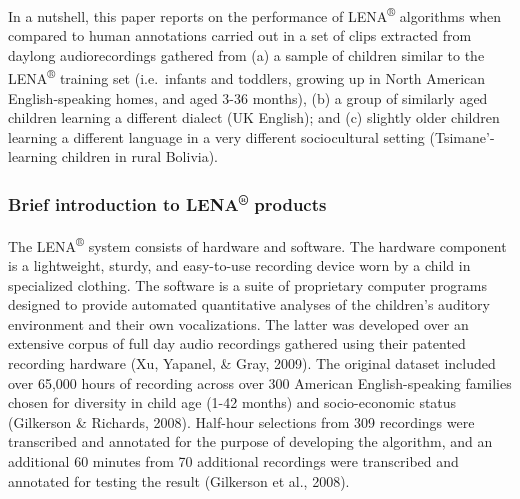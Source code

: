 \documentclass[english,table,man,floatsintext]{apa6}
\begin{document}
In a nutshell, this paper reports on the performance of LENA\textsuperscript{®} algorithms when compared to human annotations carried out in a set of clips extracted from daylong audiorecordings gathered from (a) a sample of children similar to the LENA\textsuperscript{®} training set (i.e.~infants and toddlers, growing up in North American English-speaking homes, and aged 3-36 months), (b) a group of similarly aged children learning a different dialect (UK English); and (c) slightly older children learning a different language in a very different sociocultural setting (Tsimane'-learning children in rural Bolivia).

\hypertarget{brief-introduction-to-lena-products}{%
\subsubsection{\texorpdfstring{Brief introduction to LENA\textsuperscript{®} products}{Brief introduction to LENA® products}}\label{brief-introduction-to-lena-products}}

The LENA\textsuperscript{®} system consists of hardware and software. The hardware component is a lightweight, sturdy, and easy-to-use recording device worn by a child in specialized clothing. The software is a suite of proprietary computer programs designed to provide automated quantitative analyses of the children's auditory environment and their own vocalizations. The latter was developed over an extensive corpus of full day audio recordings gathered using their patented recording hardware (Xu, Yapanel, \& Gray, 2009). The original dataset included over 65,000 hours of recording across over 300 American English-speaking families chosen for diversity in child age (1-42 months) and socio-economic status (Gilkerson \& Richards, 2008). Half-hour selections from 309 recordings were transcribed and annotated for the purpose of developing the algorithm, and an additional 60 minutes from 70 additional recordings were transcribed and annotated for testing the result (Gilkerson et al., 2008).
\end{document}

